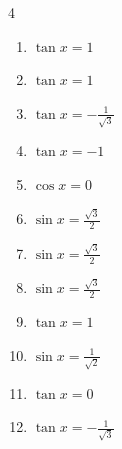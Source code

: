 \begin{multicols}{4}
\begin{enumerate}
  \item $\displaystyle \tan{x}  = 1$


  \item $\displaystyle \tan{x}  = 1$


  \item $\displaystyle \tan{x}  = -\frac{1}{\sqrt{3}}$


  \item $\displaystyle \tan{x}  = -1$


  \item $\displaystyle \cos{x}  = 0$


  \item $\displaystyle \sin{x}  = \frac{\sqrt{3}}{2}$


  \item $\displaystyle \sin{x}  = \frac{\sqrt{3}}{2}$


\columnbreak %

  \item $\displaystyle \sin{x}  = \frac{\sqrt{3}}{2}$


  \item $\displaystyle \tan{x}  = 1$


  \item $\displaystyle \sin{x}  = \frac{1}{\sqrt{2}}$


  \item $\displaystyle \tan{x}  = 0$


  \item $\displaystyle \tan{x}  = -\frac{1}{\sqrt{3}}$


\end{enumerate}
\end{multicols}

